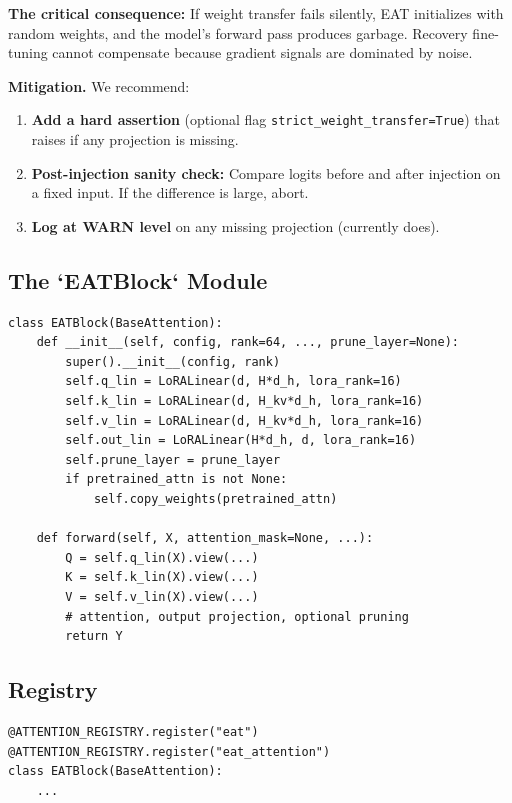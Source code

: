 \textbf{The critical consequence:} If weight transfer fails silently, EAT 
initializes with random weights, and the model's forward pass produces 
garbage. Recovery fine-tuning cannot compensate because gradient signals 
are dominated by noise.

\textbf{Mitigation.} We recommend:

\begin{enumerate}
\item \textbf{Add a hard assertion} (optional flag \texttt{strict\_weight\_transfer=True})
  that raises if any projection is missing.
\item \textbf{Post-injection sanity check:} Compare logits before and after
  injection on a fixed input. If the difference is large, abort.
\item \textbf{Log at WARN level} on any missing projection (currently does).

\end{enumerate}
\subsection{The `EATBlock` Module}

\begin{lstlisting}
class EATBlock(BaseAttention):
    def __init__(self, config, rank=64, ..., prune_layer=None):
        super().__init__(config, rank)
        self.q_lin = LoRALinear(d, H*d_h, lora_rank=16)
        self.k_lin = LoRALinear(d, H_kv*d_h, lora_rank=16)
        self.v_lin = LoRALinear(d, H_kv*d_h, lora_rank=16)
        self.out_lin = LoRALinear(H*d_h, d, lora_rank=16)
        self.prune_layer = prune_layer
        if pretrained_attn is not None:
            self.copy_weights(pretrained_attn)
    
    def forward(self, X, attention_mask=None, ...):
        Q = self.q_lin(X).view(...)
        K = self.k_lin(X).view(...)
        V = self.v_lin(X).view(...)
        # attention, output projection, optional pruning
        return Y
\end{lstlisting}

\subsection{Registry}

\begin{lstlisting}
@ATTENTION_REGISTRY.register("eat")
@ATTENTION_REGISTRY.register("eat_attention")
class EATBlock(BaseAttention):
    ...
\end{lstlisting}

